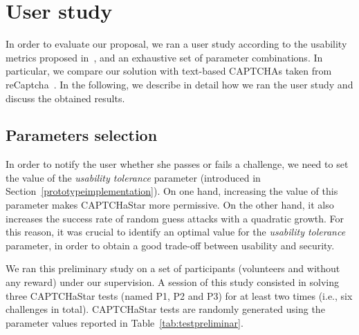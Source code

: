 \documentclass[conference]{IEEEtran}
\newcommand{\hilight}[1]{#1}
\begin{document}
\section{User study} \label{evaluateusability}
In order to evaluate our proposal, we ran a user study according to the usability metrics proposed in~\cite{yan2008usability}, and an exhaustive set of parameter combinations.
In particular, we compare our solution with text-based CAPTCHAs taken from reCaptcha~\cite{recaptchaplugin}. 
In the following, we describe in detail how we ran the user study and discuss the obtained results.  
\subsection{Parameters selection}
\label{parametersselection}
In order to notify the user whether she passes or fails a challenge, we need to set the value of the \textit{usability tolerance} parameter (introduced in Section~\ref{prototypeimplementation}).
On one hand, increasing the value of this parameter makes CAPTCHaStar more permissive.
On the other hand, it also increases the success rate of random guess attacks with a quadratic growth.
For this reason, it was crucial to identify an optimal value for the \textit{usability tolerance} parameter, in order to obtain a good trade-off between usability and security.

We ran this preliminary study on a set of  participants (volunteers and without any reward) under our supervision. A session of this study consisted in solving three CAPTCHaStar tests (named P1, P2 and P3) for at least two times (i.e., six challenges in total).
\hilight{CAPTCHaStar tests are randomly generated using the parameter values reported in Table}~\ref{tab:testpreliminar}. 

\begin{table}[ht]
\centering
{}
\caption{Values of parameters , , \textit{NSol} and \textit{Rotation} for the preliminary study.}
\label{tab:testpreliminar}
\end{table}
\end{document}
